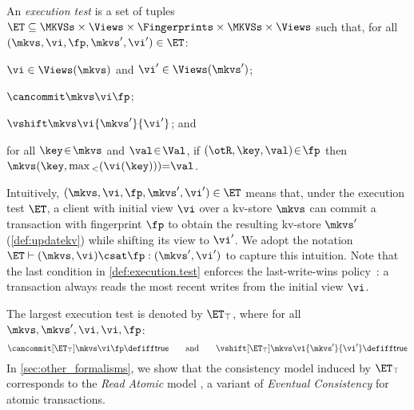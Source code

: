 \begin{definition}
\label{def:execution.test}
An \emph{execution test} is a set of tuples \(\ET \subseteq \MKVSs \times \Views \times \Fingerprints \times \MKVSs \times \Views\) 
such that, for all \((\mkvs, \vi, \fp, \mkvs', \vi') \in \ET\): 
\begin{enumerate*}
	\item \(\vi \in \Views(\mkvs)\) and \(\vi' \in \Views(\mkvs')\); 
	\item \(\cancommit \mkvs \vi \fp\); 
	\item \(\vshift \mkvs \vi {\mkvs'} {\vi'}\); and 
	\item for all \(\key \!\in\! \mkvs\) and \(\val \!\in\! \Val\), if \((\otR, \key, \val) \!\in\! \fp \) then \(	\mkvs(\key, \max{}_{<}(\vi(\key))) {=} \val   \).
\end{enumerate*}



\end{definition}
%
\noindent 
Intuitively, \((\mkvs, \vi, \fp, \mkvs', \vi') \in \ET\) means that, under the execution test \(\ET\),
a client with initial view \(\vi\) over a kv-store \(\mkvs\) can commit a transaction with 
fingerprint \(\fp\) to obtain the resulting kv-store \(\mkvs'\) (\cref{def:updatekv}) while shifting its view
to \(\vi'\). We adopt the 
notation \(\ET \vdash (\mkvs, \vi) \csat \fp: (\mkvs', \vi')\)  to
capture this intuition. 
Note that the last condition in \cref{def:execution.test} enforces the last-write-wins
policy~\cite{vogels:2009:ec:1435417.1435432}: 
a transaction always reads the most recent writes from the initial view \(\vi\).  

The largest execution test is denoted by \(\ET_{\top}\), where for all \(\mkvs, \mkvs', \vi, \vi, \fp\): 
\[
	\cancommit[\ET_{\top}] \mkvs \vi \fp \defiff \mathsf{true}
	\qquad  \text{and} \qquad 
	\vshift[\ET_{\top}] \mkvs \vi {\mkvs'} {\vi'} \defiff \mathsf{true}
\] 
In \cref{sec:other_formalisms}, we show that the consistency model induced by \(\ET_{\top}\) 
corresponds to the \emph{Read Atomic} model \cite{ramp}, a variant of \emph{Eventual 
Consistency} \cite{ev_transactions} for atomic transactions. 

